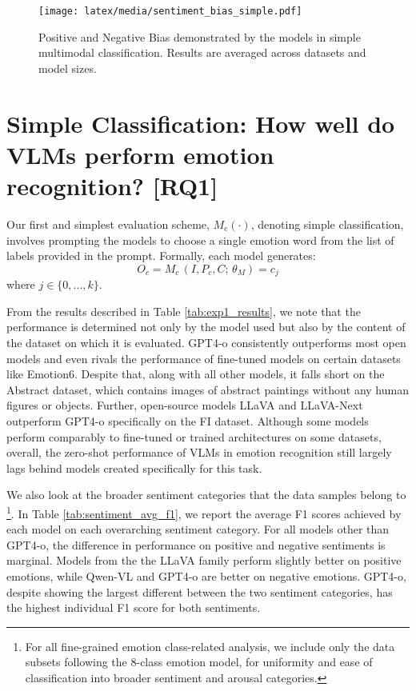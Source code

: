 \begin{figure}[t]
\centering
    \texttt{[image: latex/media/sentiment\_bias\_simple.pdf]}
    \caption{Positive and Negative Bias demonstrated by the models in simple multimodal classification. Results are averaged across datasets and model sizes.}
    \label{fig:sentiment_bias_simple}
\end{figure}

\section{Simple Classification: How well do VLMs perform emotion recognition? [RQ1]}
\label{sec:exp_rq1}

Our first and simplest evaluation scheme, \(M_{\text{c}}(\cdot)\), denoting simple classification, involves prompting the models to choose a single emotion word from the list of labels provided in the prompt. Formally, each model generates:
\begin{equation}
O_{c} = M_{c}\,(I, P_{c}, C;\, \theta_{M}) = c_{j}    
\end{equation}
where \(j \in \{0, ..., k\}\).


From the results described in Table \ref{tab:exp1_results}, we note that the performance is determined not only by the model used but also by the content of the dataset on which it is evaluated. GPT4-o consistently outperforms most open models and even rivals the performance of fine-tuned models on certain datasets \cite{xie2024emovit, xu2022mdan} like Emotion6. 
Despite that, along with all other models, it falls short on the Abstract dataset, which contains images of abstract paintings without any human figures or objects. Further, open-source models LLaVA and LLaVA-Next outperform GPT4-o specifically on the FI dataset. 
Although some models perform comparably to fine-tuned or trained architectures on some datasets, overall, the zero-shot performance of VLMs in emotion recognition still largely lags behind models created specifically for this task. 

We also look at the broader sentiment categories that the data samples belong to \footnote{For all fine-grained emotion class-related analysis, we include only the data subsets following the 8-class emotion model, for uniformity and ease of classification into broader sentiment and arousal categories.}. In Table \ref{tab:sentiment_avg_f1}, we report the average F1 scores achieved by each model on each overarching sentiment category. For all models other than GPT4-o, the difference in performance on positive and negative sentiments is marginal. Models from the the LLaVA family perform slightly better on positive emotions, while Qwen-VL and GPT4-o are better on negative emotions. GPT4-o, despite showing the largest different between the two sentiment categories, has the highest individual F1 score for both sentiments. 

